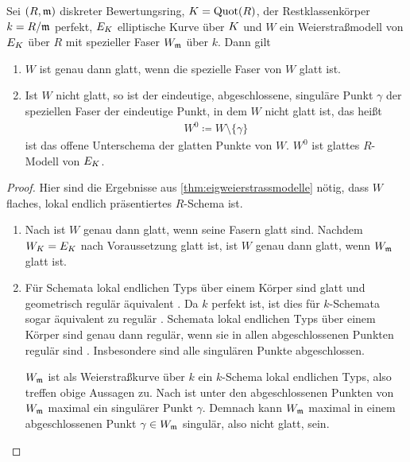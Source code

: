 \begin{Satz}\label{thm:weierstrassglatt}
  Sei $(R,\mathfrak{m})$ diskreter Bewertungsring,
  $K=\operatorname{Quot}(R)$,
  der Restklassenkörper $k=R/\mathfrak{m}$ perfekt,
  $E_{K}$ elliptische Kurve über $K$ und
  $W$ ein Weierstraßmodell von $E_{K}$ über $R$
  mit spezieller Faser $W_{\mathfrak{m}}$ über $k$.
  Dann gilt
  \begin{enumerate}[label=(\alph*)]
  \item $W$ ist genau dann glatt, wenn die spezielle Faser von $W$ glatt
    ist.
  \item Ist $W$ nicht glatt, so ist der eindeutige, abgeschlossene,
    singuläre Punkt $\gamma$ der speziellen Faser der eindeutige
    Punkt, in dem $W$ nicht glatt ist, das heißt
    \begin{gather*}
      W^0\coloneqq W\setminus \{\gamma\}
    \end{gather*}
    ist das offene Unterschema der glatten Punkte von $W$.
    $W^0$ ist glattes $R$-Modell von $E_{K}$.
  \end{enumerate}
  \begin{proof}
    Hier sind die Ergebnisse aus \ref{thm:eigweierstrassmodelle}
    nötig, dass $W$ flaches, lokal endlich präsentiertes
    $R$-Schema ist.
    \begin{enumerate}[resume*,start=1]
    \item 
      Nach \cite[Proposition~8.5/17]{bosch} ist $W$ genau dann
      glatt, wenn seine Fasern glatt sind.
      Nachdem $W_{K}=E_{K}$ nach Voraussetzung glatt ist, ist $W$ genau
      dann glatt, wenn $W_{\mathfrak{m}}$ glatt ist.
    \item Für Schemata lokal endlichen Typs über einem Körper sind
      glatt und geometrisch regulär äquivalent
      \cite[Corollary~6.32]{wedhorn}.
      Da $k$ perfekt ist, ist dies für $k$-Schemata sogar
      äquivalent zu regulär
      \cite[Remark~6.33]{wedhorn}.
      Schemata lokal endlichen Typs über einem Körper sind genau dann
      regulär, wenn sie in allen abgeschlossenen Punkten regulär sind
      \cite[Remark~6.25~(3)]{wedhorn}. Insbesondere sind alle
      singulären Punkte abgeschlossen.

      $W_{\mathfrak{m}}$ ist als Weierstraßkurve über $k$ ein $k$-Schema
      lokal endlichen Typs, also treffen obige Aussagen zu.
      Nach \cite[Proposition~III.1.4]{silverman} ist unter den
      abgeschlossenen Punkten von $W_{\mathfrak{m}}$ maximal ein singulärer Punkt
      $\gamma$. Demnach kann $W_{\mathfrak{m}}$ maximal in einem abgeschlossenen
      Punkt $\gamma\in W_{\mathfrak{m}}$ singulär, also nicht glatt, sein.


\end{enumerate}
\end{proof}
\end{Satz}
